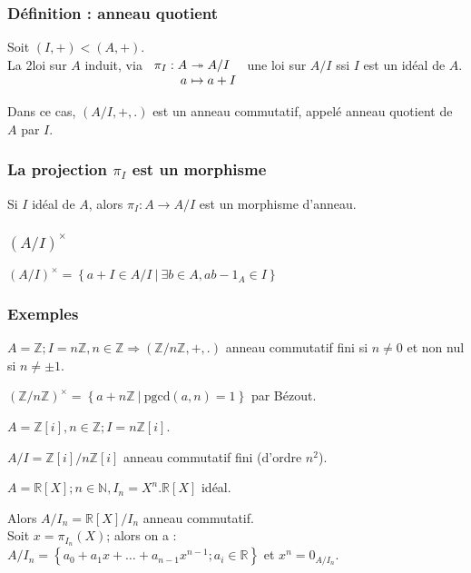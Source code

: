 \documentclass[reqno,a4paper,10pt]{report}
\makeatletter
\newcommand{\set}[1]{\left\lbrace #1 \right\rbrace} %
\newcommand{\IZ}{\ensuremath{\mathbb{Z}}\xspace} %
\newcommand{\IR}{\ensuremath{\mathbb{R}}\xspace} %
\newcommand{\IN}{\ensuremath{\mathbb{N}}\xspace} %
\newcommand{\so}{\Rightarrow}
\newcommand{\surj}{\twoheadrightarrow}
\newcommand{\pgcd}{\mathrm{pgcd}} %
\newcommand{\Such}{\ \Big| \ }
\newcommand{\such}{\ | \ }
\let\olditemize=\itemize%
\renewenvironment{itemize}{%
    \olditemize%
  }{%
    \@noparlisttrue%
    \endlist%
  }%
\makeatother
\begin{document}
\subsubsection{Définition : anneau quotient}
Soit $(I,+) < (A,+)$.\\
La 2\ieme loi sur $A$ induit, via $\begin{array}[t]{r@{\ }l}
  \pi_I : A &\surj A/I\\
  a &\mapsto a+I
\end{array}$ une loi sur $A/I$ ssi $I$ est
un idéal de $A$.

Dans ce cas, $(A/I, +, .)$ est un anneau commutatif, appelé anneau quotient de
$A$ par $I$.


\subsubsection{La projection $\pi_I$ est un morphisme}
Si $I$ idéal de $A$, alors $\pi_I: A \to A/I$ est un morphisme d'anneau.

\subsubsection{$(A/I)^\times$}
$(A/I)^\times = \set{a + I \in A/I \Such \exists b \in A, ab - 1_A \in I}$

\subsubsection{Exemples}
\begin{itemize}
  \item $A=\IZ; I=n\IZ, n \in \IZ \so (\IZ/n\IZ, +, .)$ anneau commutatif fini
    si $n\neq 0$ et non nul si $n\neq \pm 1$.
  
    $(\IZ/n\IZ)^\times = \set{a+n\IZ \such \pgcd(a,n)=1}$ par Bézout.

  \item $A=\IZ[i], n \in \IZ; I=n\IZ[i]$.

    $A/I=\IZ[i]/n\IZ[i]$ anneau commutatif fini (d'ordre $n^2$).

  \item $A=\IR[X]; n \in \IN, I_n=X^n.\IR[X]$ idéal.

    Alors $A/I_n=\IR[X]/I_n$ anneau commutatif.\\
    Soit $x=\pi_{I_n}(X)$; alors on a :\\
    $A/I_n=\set{a_0+a_1 x + \dots + a_{n-1} x^{n-1}; a_i \in \IR}$ et $x^n =
    0_{A/I_n}$.
\end{itemize}
\end{document}
